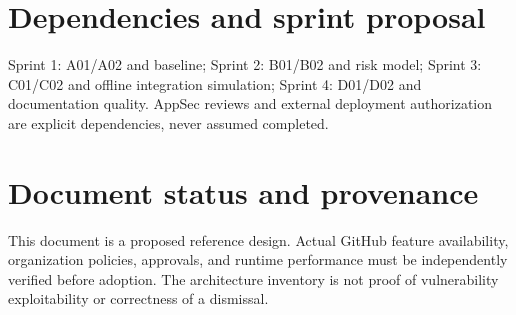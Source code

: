 \documentclass[11pt,letterpaper]{article}
\begin{document}
\section{Dependencies and sprint proposal}
Sprint 1: A01/A02 and baseline; Sprint 2: B01/B02 and risk model; Sprint 3: C01/C02 and offline integration simulation; Sprint 4: D01/D02 and documentation quality. AppSec reviews and external deployment authorization are explicit dependencies, never assumed completed.


\section*{Document status and provenance}
This document is a proposed reference design. Actual GitHub feature availability, organization policies, approvals, and runtime performance must be independently verified before adoption. The architecture inventory is not proof of vulnerability exploitability or correctness of a dismissal.
\end{document}
